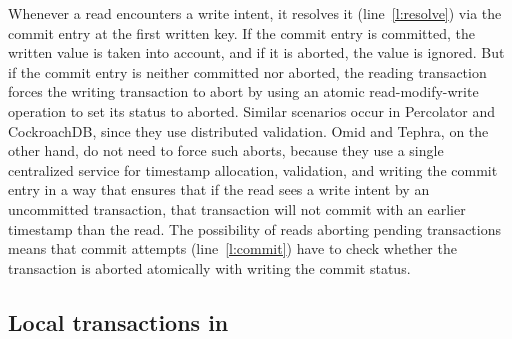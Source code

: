 Whenever a read encounters a write intent, it resolves it (line~\ref{l:resolve}) via the commit entry at the first written key. 
If the commit entry is committed, the written value is taken into account, and if it is aborted, the value is ignored. 
But if the commit entry is neither committed nor aborted, the reading transaction forces the writing transaction to abort by using 
an atomic read-modify-write operation to set its status to aborted. Similar scenarios occur in Percolator and CockroachDB, since 
they use distributed validation. Omid and Tephra, on the other hand, do not need to force such aborts, because they use a single centralized service for timestamp allocation, validation, and writing the commit entry in a way that ensures that  if the read sees a write intent by an uncommitted transaction, that transaction will not commit with an earlier timestamp than the read.
%
The possibility of reads aborting pending transactions means that commit attempts (line~\ref{l:commit}) have to  
check whether the transaction is aborted atomically with writing the commit status.


\subsection{Local transactions in \sys}
\label{ssec:fp-impl}




